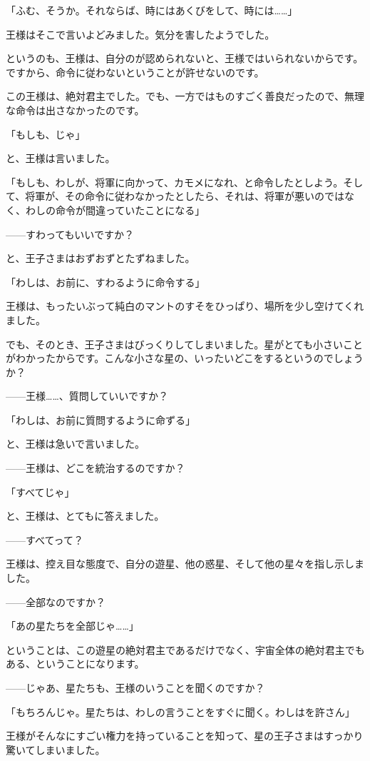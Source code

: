 「ふむ、そうか。それならば、時にはあくびをして、時には……」

王様はそこで言いよどみました。気分を害したようでした。

というのも、王様は、自分のが認められないと、王様ではいられないからです。ですから、命令に従わないということが許せないのです。

この王様は、絶対君主でした。でも、一方ではものすごく善良だったので、無理な命令は出さなかったのです。

「もしも、じゃ」

と、王様は言いました。

「もしも、わしが、将軍に向かって、カモメになれ、と命令したとしよう。そして、将軍が、その命令に従わなかったとしたら、それは、将軍が悪いのではなく、わしの命令が間違っていたことになる」

——すわってもいいですか？

と、王子さまはおずおずとたずねました。

「わしは、お前に、すわるように命令する」

王様は、もったいぶって純白のマントのすそをひっぱり、場所を少し空けてくれました。

でも、そのとき、王子さまはびっくりしてしまいました。星がとても小さいことがわかったからです。こんな小さな星の、いったいどこをするというのでしょうか？

——王様……、質問していいですか？

「わしは、お前に質問するように命ずる」

と、王様は急いで言いました。

——王様は、どこを統治するのですか？

「すべてじゃ」

と、王様は、とてもに答えました。

——すべてって？

王様は、控え目な態度で、自分の遊星、他の惑星、そして他の星々を指し示しました。

——全部なのですか？

「あの星たちを全部じゃ……」

ということは、この遊星の絶対君主であるだけでなく、宇宙全体の絶対君主でもある、ということになります。

——じゃあ、星たちも、王様のいうことを聞くのですか？

「もちろんじゃ。星たちは、わしの言うことをすぐに聞く。わしはを許さん」

王様がそんなにすごい権力を持っていることを知って、星の王子さまはすっかり驚いてしまいました。

